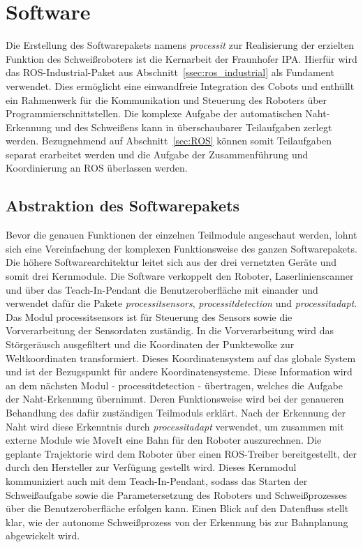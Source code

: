 \section{Software}
Die Erstellung des Softwarepakets namens \emph{processit} zur Realisierung der erzielten Funktion des Schweißroboters ist die Kernarbeit der Fraunhofer IPA. Hierfür wird das ROS-Industrial-Paket aus Abschnitt~\ref{ssec:ros_industrial} als Fundament verwendet. Dies ermöglicht eine einwandfreie Integration des Cobots und enthüllt ein Rahmenwerk für die Kommunikation und Steuerung des Roboters über Programmierschnittstellen. Die komplexe Aufgabe der automatischen Naht-Erkennung und des Schweißens kann in überschaubarer Teilaufgaben zerlegt werden. Bezugnehmend auf Abschnitt~\ref{sec:ROS} können somit Teilaufgaben separat erarbeitet werden und die Aufgabe der Zusammenführung und Koordinierung an ROS überlassen werden.

\subsection{Abstraktion des Softwarepakets}
Bevor die genauen Funktionen der einzelnen Teilmodule angeschaut werden, lohnt sich eine Vereinfachung der komplexen Funktionsweise des ganzen Softwarepakets. Die höhere Softwarearchitektur leitet sich aus der drei vernetzten Geräte und somit drei Kernmodule. Die Software verkoppelt den Roboter, Laserlinienscanner und über das Teach-In-Pendant die Benutzeroberfläche mit einander und verwendet dafür die Pakete \emph{processit\textunderscore sensors}, \emph{processit\textunderscore detection} und \emph{processit\textunderscore adapt}. Das Modul processit\textunderscore sensors ist für Steuerung des Sensors sowie die Vorverarbeitung der Sensordaten zuständig. In die Vorverarbeitung wird das Störgeräusch ausgefiltert und die Koordinaten der Punktewolke zur Weltkoordinaten transformiert. Dieses Koordinatensystem auf das globale System und ist der Bezugspunkt für andere Koordinatensysteme. Diese Information wird an dem nächsten Modul - processit\textunderscore detection - übertragen, welches die Aufgabe der Naht-Erkennung übernimmt. Deren Funktionsweise wird bei der genaueren Behandlung des dafür zuständigen Teilmoduls erklärt. Nach der Erkennung der Naht wird diese Erkenntnis durch \emph{processit\textunderscore adapt} verwendet, um zusammen mit externe Module wie MoveIt eine Bahn für den Roboter auszurechnen. Die geplante Trajektorie wird dem Roboter über einen ROS-Treiber bereitgestellt, der durch den Hersteller zur Verfügung gestellt wird. Dieses Kernmodul kommuniziert auch mit dem Teach-In-Pendant, sodass das Starten der Schweißaufgabe sowie die Parametersetzung des Roboters und Schweißprozesses über die Benutzeroberfläche erfolgen kann. Einen Blick auf den Datenfluss stellt klar, wie der autonome Schweißprozess von der Erkennung bis zur Bahnplanung abgewickelt wird.

